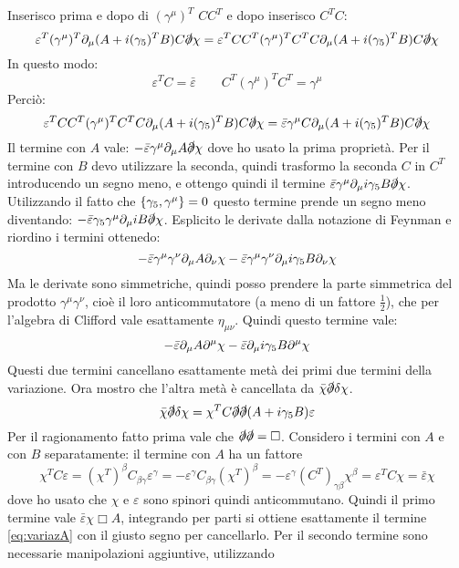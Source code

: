 \documentclass[]{scrartcl}
\begin{document}
Inserisco prima e dopo di $ (\gamma^\mu)^T $ $ C C^T $ e dopo inserisco $ C^T C $:
\[
  \varepsilon^T (\gamma^\mu)^T \partial_{\mu} (A + i (\gamma_5)^T B) C \slashed{\partial} \chi  =
  \varepsilon^T C C^T (\gamma^\mu)^T C^T C \partial_{\mu} (A + i (\gamma_5)^T B) C \slashed{\partial} \chi
\]
In questo modo:
\[
  \varepsilon^T C = \bar{\varepsilon} \qquad  C^T (\gamma^\mu)^T C^T = \gamma^\mu
\]
Perciò:
\[
  \varepsilon^T C C^T (\gamma^\mu)^T C^T C \partial_{\mu} (A + i (\gamma_5)^T B) C \slashed{\partial} \chi =
  \bar{\varepsilon} \gamma^\mu  C \partial_{\mu} (A + i (\gamma_5)^T B) C \slashed{\partial} \chi
\]
Il termine con $ A $ vale: $ -\bar{\varepsilon} \gamma^\mu \partial_{\mu} A \slashed{\partial} \chi $ dove ho usato la prima proprietà.
Per il termine con $ B $ devo utilizzare la seconda, quindi trasformo la seconda $ C $ in $ C^T $ introducendo un segno meno, e ottengo
quindi il termine $ \bar{\varepsilon} \gamma^\mu \partial_{\mu} i \gamma_5 B \slashed{\partial} \chi $. Utilizzando il fatto che $ \acomm{\gamma_5}{\gamma^\mu} = 0 $
questo termine prende un segno meno diventando:  $ - \bar{\varepsilon} \gamma_5 \gamma^\mu \partial_{\mu} i  B \slashed{\partial} \chi $. Esplicito le derivate dalla
notazione di Feynman e riordino i termini ottenedo:
\[
  - \bar{\varepsilon} \gamma^\mu \gamma^\nu \partial_{\mu} A \partial_{\nu} \chi  - \bar{\varepsilon} \gamma^\mu \gamma^\nu \partial_{\mu} i \gamma_5 B \partial_{\nu} \chi
\]
Ma le derivate sono simmetriche, quindi posso prendere la parte simmetrica del prodotto $ \gamma^\mu \gamma^\nu $, cioè il loro anticommutatore (a meno di un fattore
$ \frac{1}{2} $), che per l'algebra di Clifford vale esattamente $ \eta_{\mu\nu} $. Quindi questo termine vale:
\[
  - \bar{\varepsilon}  \partial_{\mu} A \partial^{\mu} \chi  - \bar{\varepsilon}  \partial_{\mu} i \gamma_5 B \partial^{\mu} \chi
\]
Questi due termini cancellano esattamente metà dei primi due termini della variazione. Ora mostro che l'altra metà è cancellata da $ \bar{\chi} \slashed{\partial} \delta\chi $.
\[
  \bar{\chi} \slashed{\partial} \delta\chi = \chi^T C \slashed{\partial} \slashed{\partial} (A + i \gamma_5 B) \varepsilon
\]
Per il ragionamento fatto prima vale che $ \slashed{\partial} \slashed{\partial} = \Box $. Considero i termini con $ A $ e con $ B $ separatamente: il termine con $ A $ ha un fattore
\[
  \chi^T C \varepsilon = (\chi^T)^{\beta}C_{\beta\gamma}\varepsilon^\gamma = - \varepsilon^\gamma C_{\beta\gamma}(\chi^T)^{\beta} =
  -  \varepsilon^\gamma (C^T)_{\gamma\beta}\chi^{\beta} = \varepsilon^T C \chi = \bar{\varepsilon} \chi
\]
dove ho usato che $ \chi $ e $ \varepsilon $ sono spinori quindi anticommutano. Quindi il primo termine vale $ \bar{\varepsilon}\chi\Box A $, integrando per parti
si ottiene esattamente il termine \eqref{eq:variazA} con il giusto segno per cancellarlo. Per il secondo termine sono necessarie manipolazioni aggiuntive, utilizzando
\end{document}
